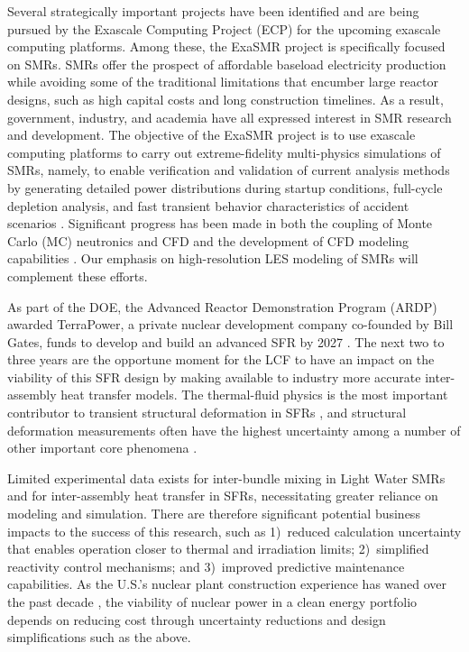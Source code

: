 Several strategically important projects have been identified and are being pursued by
the Exascale Computing Project (ECP) for the upcoming exascale computing platforms.
Among these, the ExaSMR project is specifically focused on SMRs.
SMRs offer the prospect of affordable baseload electricity production while
avoiding some of the traditional limitations that encumber large reactor designs,
such as high capital costs and long construction timelines.
As a result, government, industry, and academia have all expressed interest in
SMR research and development.
The objective of the ExaSMR project is to use exascale computing platforms to
carry out extreme-fidelity multi-physics simulations of SMRs, namely,
to enable verification and validation of current analysis methods by
generating detailed power distributions during startup conditions,
full-cycle depletion analysis, and fast transient behavior characteristics of
accident scenarios \cite{Merzari2018}.
Significant progress has been made in both the coupling of Monte Carlo (MC) neutronics
and CFD \cite{Hamilton2018,Hamilton2019} and the development of CFD modeling
capabilities \cite{Fang2021,Merzari2018}. Our emphasis on high-resolution
LES modeling of SMRs will complement these efforts.

As part of the DOE, the Advanced Reactor Demonstration
Program (ARDP) awarded TerraPower, a private nuclear development company
co-founded by Bill Gates, funds
to develop and build an advanced SFR by 2027 \cite{ardp_tp}. The next two to
three years are the opportune moment for the LCF to have an impact on the
viability of this SFR design by making available to industry more accurate
inter-assembly heat transfer models. The thermal-fluid physics is the most important
contributor to transient structural deformation in SFRs \cite{wozniak}, and
structural deformation measurements often have the highest uncertainty among a number of
other important core phenomena \cite{lum}.

Limited experimental data exists for inter-bundle mixing in Light Water SMRs
and for inter-assembly heat transfer in SFRs, necessitating greater reliance on
modeling and simulation. There
are therefore significant potential business impacts to the success of this
research, such as 1)~reduced calculation uncertainty that enables operation closer
to thermal and irradiation limits; 2)~simplified reactivity control mechanisms;
and 3)~improved predictive maintenance capabilities.
As the U.S.'s nuclear plant construction
experience has waned over the past decade \cite{schlissel}, the viability of
nuclear power in a clean energy portfolio depends on reducing cost through
uncertainty reductions and design simplifications such as the above.

